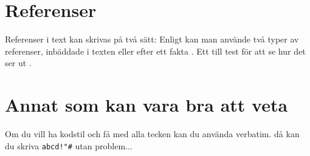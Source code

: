\documentclass[11p]{article}
\begin{document}
    \section{Referenser}
    Referenser i text kan skrivas på två sätt: Enligt \textcite{Jens} kan man använde två typer av referenser, inbäddade i texten eller efter ett fakta \parencite{Fraenkel}. Ett till test för att se hur det ser ut \parencite[sid 55]{fermi}.

    \section{Annat som kan vara bra att veta}
    Om du vill ha kodstil och få med alla tecken kan du använda verbatim. då kan du skriva \verb|abcd!"#| utan problem...
\end{document}
